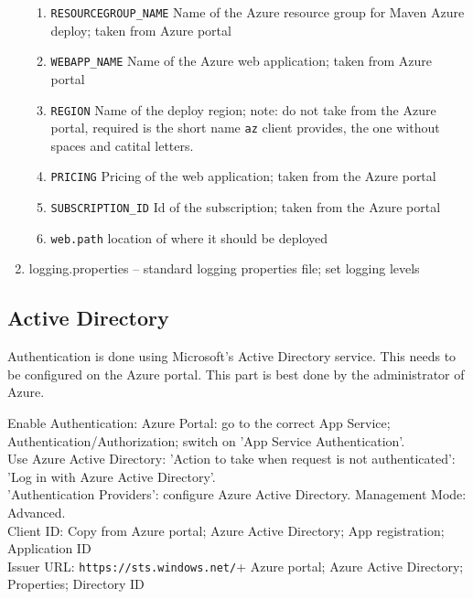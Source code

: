 \begin{enumerate}
\begin{enumerate}
  	  \item \verb|RESOURCEGROUP_NAME| Name of the Azure resource group for Maven Azure deploy; taken from Azure portal
  	  \item \verb|WEBAPP_NAME| Name of the Azure web application; taken from Azure portal
  	  \item \verb|REGION| Name of the deploy region; note: do not take from the Azure portal, required is the short name \verb|az| client provides, the one without spaces and catital letters.
  	  \item \verb|PRICING| Pricing of the web application; taken from the Azure portal
  	  \item \verb|SUBSCRIPTION_ID| Id of the subscription; taken from the Azure portal
  	  \item \verb|web.path| location of where it should be deployed
	\end{enumerate}
  \item logging.properties -- standard logging properties file; set logging levels
\end{enumerate}

\subsection{Active Directory}

Authentication is done using Microsoft's Active Directory service. This needs to be configured on the Azure portal. This part is best done by the administrator of Azure.

Enable Authentication: Azure Portal: go to the correct App Service; Authentication/Authorization; switch on 'App Service Authentication'.\\ 
Use Azure Active Directory: 'Action to take when request is not authenticated': 'Log in with Azure Active Directory'.\\
'Authentication Providers': configure Azure Active Directory. Management Mode:
Advanced. \\

Client ID: Copy from Azure portal; Azure Active Directory; App registration; Application ID\\
Issuer URL: \verb|https://sts.windows.net/|+ Azure portal; Azure Active Directory;  Properties; Directory ID\\
 